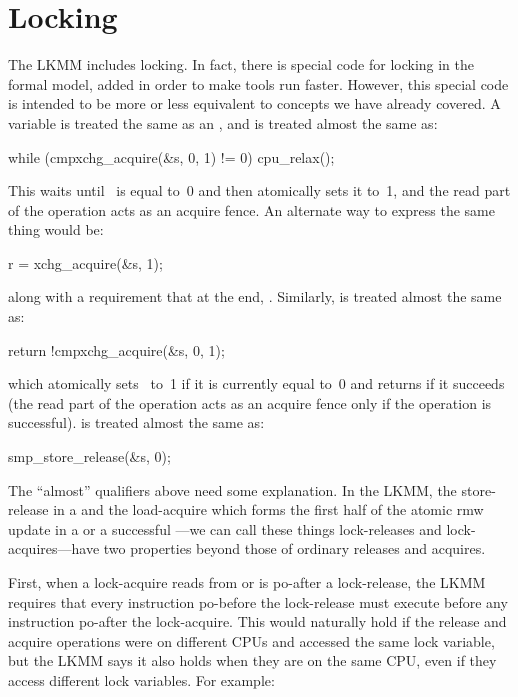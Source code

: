 \section{Locking}
\label{sec:docs:explanation:Locking}

The LKMM includes locking.
In fact, there is special code for locking
in the formal model, added in order to make tools run faster.
However, this special code is intended to be more or less equivalent
to concepts we have already covered.
A  variable is treated
the same as an , and  is treated almost the same as:

\begin{VerbatimU}
	while (cmpxchg_acquire(&s, 0, 1) != 0)
		cpu_relax();
\end{VerbatimU}

This waits until ~is equal to~0 and then atomically sets it to~1,
and the read part of the  operation acts as an acquire fence.
An alternate way to express the same thing would be:

\begin{VerbatimU}
	r = xchg_acquire(&s, 1);
\end{VerbatimU}

\noindent%
along with a requirement that at the end, .
Similarly,
 is treated almost the same as:

\begin{VerbatimU}
	return !cmpxchg_acquire(&s, 0, 1);
\end{VerbatimU}

\noindent%
which atomically sets~ to~1 if it is currently equal to~0 and returns
 if it succeeds (the read part of the  operation acts as an
acquire fence only if the operation is successful).
is treated almost the same as:

\begin{VerbatimU}
	smp_store_release(&s, 0);
\end{VerbatimU}

The ``almost'' qualifiers above need some explanation.
In the LKMM, the
store-release in a  and the load-acquire which forms the
first half of the atomic rmw update in a  or a successful
---we can call these things lock-releases and
lock-acquires---have two properties beyond those of ordinary releases
and acquires.

First, when a lock-acquire reads from or is po-after a lock-release,
the LKMM requires that every instruction po-before the lock-release
must execute before any instruction po-after the lock-acquire.
This
would naturally hold if the release and acquire operations were on
different CPUs and accessed the same lock variable, but the LKMM says
it also holds when they are on the same CPU, even if they access
different lock variables.
For example:

